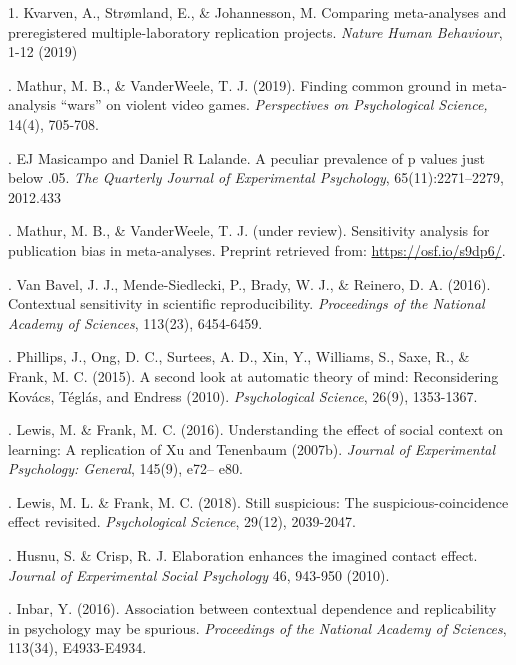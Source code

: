 \documentclass[12pt]{article}
\begin{document}
1. Kvarven, A., Strømland, E., \& Johannesson, M. Comparing meta-analyses and preregistered multiple-laboratory replication projects. {\it Nature Human Behaviour}, 1-12 (2019)
 \vspace{3mm}
 
. Mathur, M. B., \& VanderWeele, T. J. (2019). Finding common ground in meta-analysis “wars” on violent video games. {\it  Perspectives on Psychological Science,} 14(4), 705-708.
\vspace{3mm}

. EJ Masicampo and Daniel R Lalande. A peculiar prevalence of p values just below .05. {\it The Quarterly Journal of Experimental Psychology}, 65(11):2271–2279, 2012.433
\vspace{3mm}

. Mathur, M. B., \& VanderWeele, T. J. (under review). Sensitivity analysis for publication bias in meta-analyses. Preprint retrieved from:  \url{ https://osf.io/s9dp6/}.
\vspace{3mm}

. Van Bavel, J. J., Mende-Siedlecki, P., Brady, W. J., \& Reinero, D. A. (2016). Contextual sensitivity in scientific reproducibility.  {\it Proceedings of the National Academy of Sciences}, 113(23), 6454-6459.
\vspace{3mm}

. Phillips, J., Ong, D. C., Surtees, A. D., Xin, Y., Williams, S., Saxe, R., \& Frank, M. C. (2015). A second look at automatic theory of mind: Reconsidering Kovács, Téglás, and Endress (2010).  {\it Psychological Science}, 26(9), 1353-1367.
\vspace{3mm}

. Lewis, M. \& Frank, M. C. (2016). Understanding the effect of social context on learning: A replication of Xu and Tenenbaum (2007b).  {\it Journal of Experimental Psychology: General}, 145(9), e72– e80.
\vspace{3mm}

. Lewis, M. L. \& Frank, M. C. (2018). Still suspicious: The suspicious-coincidence effect revisited.  {\it Psychological Science}, 29(12), 2039-2047.
\vspace{3mm}

. Husnu, S. \& Crisp, R. J. Elaboration enhances the imagined contact effect. {\it Journal of Experimental Social Psychology} 46, 943-950 (2010).
\vspace{3mm}

. Inbar, Y. (2016). Association between contextual dependence and replicability in psychology may be spurious.  {\it Proceedings of the National Academy of Sciences}, 113(34), E4933-E4934.
\vspace{3mm}
\end{document}
